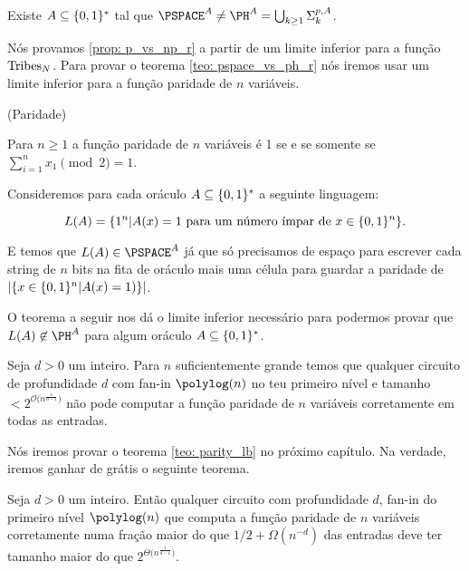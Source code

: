 \begin{teo} \label{teo: pspace_vs_ph_r}

Existe $A \subseteq \{0, 1\}^{*}$ tal que $\PSPACE^{A} \neq \PH^{A} = \bigcup_{k \geq 1} \Sigma_{k}^{p, A}$.

\end{teo}

Nós provamos \ref{prop: p_vs_np_r} a partir de um limite inferior para a função $\text{Tribes}_{N}$. Para provar o teorema \ref{teo: pspace_vs_ph_r} nós iremos usar um limite inferior para a função paridade de $n$ variáveis.

\begin{defi} (Paridade)

Para $n \geq 1$ a função paridade de $n$ variáveis é 1 se e se somente se $\sum_{i = 1}^{n} x_{1} \pmod{2} = 1$.

\end{defi}

Consideremos para cada oráculo $A \subseteq \{0, 1\}^{*}$ a seguinte linguagem:

\begin{equation*}
    L(A) = \{1^{n} \lvert A(x) = 1 \text{ para um número ímpar de } x \in \{0, 1\}^{n}\}.
\end{equation*}

E temos que $L(A) \in \PSPACE^{A}$ já que só precisamos de espaço para escrever cada string de $n$ bits na fita de oráculo mais uma célula para guardar a paridade de $\lvert \{x \in \{0, 1\}^{n} \lvert A(x) = 1)\} \rvert$.

O teorema a seguir nos dá o limite inferior necessário para podermos provar que $L(A) \not\in \PH^{A}$ para algum oráculo $A \subseteq \{0, 1\}^{*}$. 

\begin{teo} \label{teo: parity_lb}

Seja $d > 0$ um inteiro. Para $n$ suficientemente grande temos que qualquer circuito de profundidade $d$ com fan-in $\polylog(n)$ no teu primeiro nível e tamanho $< 2^{\mathcal{O}\big(n^{\frac{1}{d - 1}}\big)}$ não pode computar a função paridade de $n$ variáveis corretamente em todas as entradas. 

\end{teo}

Nós iremos provar o teorema \ref{teo: parity_lb} no próximo capítulo. Na verdade, iremos ganhar de grátis o seguinte teorema.

\begin{teo} \label{teo: parity_lb_app}

Seja $d > 0$ um inteiro. Então qualquer circuito com profundidade $d$, fan-in do primeiro nível $\polylog(n)$ que computa a função paridade de $n$ variáveis corretamente numa fração maior do que $1/2 + \Omega(n^{-d})$ das entradas deve ter tamanho maior do que $2^{\Theta\big(n^{\frac{1}{d - 1}}\big)}$.

\end{teo}

